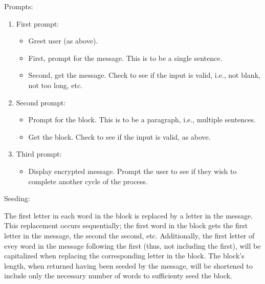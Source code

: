 \documentclass[12]{article}
\begin{document}
	Prompts:
\begin{enumerate}
\item First prompt:
	\begin{itemize}
	\item Greet user (as above).
	\item First, prompt for the message. This is to be a single sentence. 
	\item Second, get the message. Check to see if the input is valid, i.e., not blank, not too long, etc.
	\end{itemize}
\item Second prompt:
	\begin{itemize}
	\item Prompt for the block. This is to be a paragraph, i.e., multiple sentences.
	\item Get the block. Check to see if the input is valid, as above.
	\end{itemize}
\item Third prompt:
	\begin{itemize}
	\item Display encrypted message. Prompt the user to see if they wish to complete another cycle of the process.
	\end{itemize}
\end{enumerate}
Seeding:

	The first letter in each word in the block is replaced by a letter in the message. This replacement occurs sequentially; the first word in the block gets the first letter in the message, the second the second, etc. Additionally, the first letter of evey word in the message following the first (thus, not including the first), will be capitalized when replacing the corresponding letter in the block. The block's length, when returned having been seeded by the message, will be shortened to include only the necessary number of words to sufficienty seed the block.
	
\end{document}

